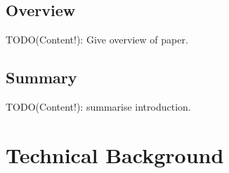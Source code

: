 \documentclass[a4paper,12pt,twoside,openright]{report}
\begin{document}
\section{Overview}




TODO(Content!): Give overview of paper.

\section{Summary}

TODO(Content!): summarise introduction.

\chapter{Technical Background}

\label{chp:technical_background}



\end{document}

